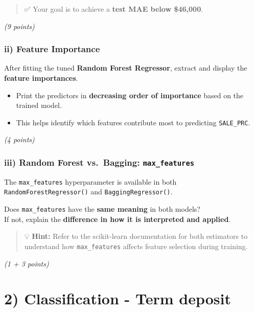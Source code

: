 \documentclass[
  letterpaper,
  DIV=11,
  numbers=noendperiod]{scrreprt}
\providecommand{\tightlist}{%
  \setlength{\itemsep}{0pt}\setlength{\parskip}{0pt}}\usepackage{longtable,booktabs,array}
\begin{document}
\begin{quote}
✅ Your goal is to achieve a \textbf{test MAE below \$46,000}.
\end{quote}

\emph{(9 points)}

\subsubsection{ii) Feature Importance}\label{ii-feature-importance}

After fitting the tuned \textbf{Random Forest Regressor}, extract and
display the \textbf{feature importances}.

\begin{itemize}
\tightlist
\item
  Print the predictors in \textbf{decreasing order of importance} based
  on the trained model.
\item
  This helps identify which features contribute most to predicting
  \texttt{SALE\_PRC}.
\end{itemize}

\emph{(4 points)}

\subsubsection{\texorpdfstring{iii) Random Forest vs.~Bagging:
\texttt{max\_features}}{iii) Random Forest vs.~Bagging: max\_features}}\label{iii-random-forest-vs.-bagging-max_features}

The \texttt{max\_features} hyperparameter is available in both
\texttt{RandomForestRegressor()} and \texttt{BaggingRegressor()}.

Does \texttt{max\_features} have the \textbf{same meaning} in both
models?\\
If not, explain the \textbf{difference in how it is interpreted and
applied}.

\begin{quote}
💡 \textbf{Hint:} Refer to the scikit-learn documentation for both
estimators to understand how \texttt{max\_features} affects feature
selection during training.
\end{quote}

\emph{(1 + 3 points)}

\section{2) Classification - Term
deposit}\label{classification---term-deposit}
\end{document}
